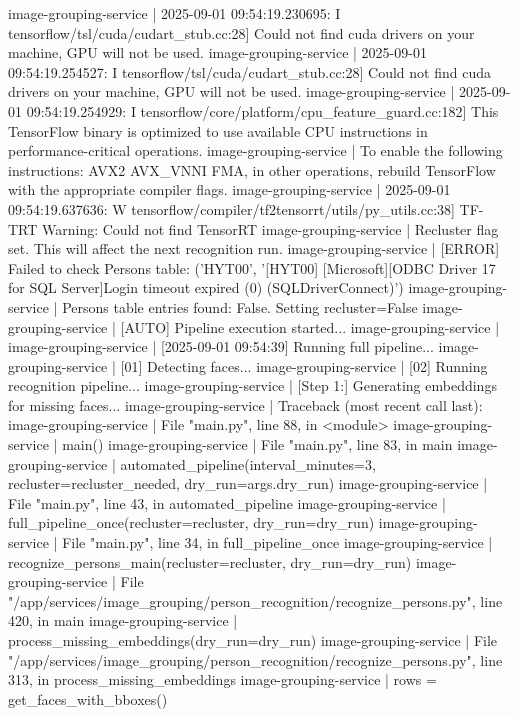 image-grouping-service  | 2025-09-01 09:54:19.230695: I tensorflow/tsl/cuda/cudart_stub.cc:28] Could not find cuda drivers on your machine, GPU will not be used.
image-grouping-service  | 2025-09-01 09:54:19.254527: I tensorflow/tsl/cuda/cudart_stub.cc:28] Could not find cuda drivers on your machine, GPU will not be used.
image-grouping-service  | 2025-09-01 09:54:19.254929: I tensorflow/core/platform/cpu_feature_guard.cc:182] This TensorFlow binary is optimized to use available CPU instructions in performance-critical operations.
image-grouping-service  | To enable the following instructions: AVX2 AVX_VNNI FMA, in other operations, rebuild TensorFlow with the appropriate compiler flags.
image-grouping-service  | 2025-09-01 09:54:19.637636: W tensorflow/compiler/tf2tensorrt/utils/py_utils.cc:38] TF-TRT Warning: Could not find TensorRT
image-grouping-service  | Recluster flag set. This will affect the next recognition run.
image-grouping-service  | [ERROR] Failed to check Persons table: ('HYT00', '[HYT00] [Microsoft][ODBC Driver 17 for SQL Server]Login timeout expired (0) (SQLDriverConnect)')
image-grouping-service  | Persons table entries found: False. Setting recluster=False
image-grouping-service  | [AUTO] Pipeline execution started...
image-grouping-service  |
image-grouping-service  | [2025-09-01 09:54:39] Running full pipeline...
image-grouping-service  | [01] Detecting faces...
image-grouping-service  | [02] Running recognition pipeline...
image-grouping-service  | [Step 1:] Generating embeddings for missing faces...
image-grouping-service  | Traceback (most recent call last):
image-grouping-service  |   File "main.py", line 88, in <module>
image-grouping-service  |     main()
image-grouping-service  |   File "main.py", line 83, in main
image-grouping-service  |     automated_pipeline(interval_minutes=3, recluster=recluster_needed, dry_run=args.dry_run)
image-grouping-service  |   File "main.py", line 43, in automated_pipeline
image-grouping-service  |     full_pipeline_once(recluster=recluster, dry_run=dry_run)
image-grouping-service  |   File "main.py", line 34, in full_pipeline_once
image-grouping-service  |     recognize_persons_main(recluster=recluster, dry_run=dry_run)
image-grouping-service  |   File "/app/services/image_grouping/person_recognition/recognize_persons.py", line 420, in main
image-grouping-service  |     process_missing_embeddings(dry_run=dry_run)
image-grouping-service  |   File "/app/services/image_grouping/person_recognition/recognize_persons.py", line 313, in process_missing_embeddings
image-grouping-service  |     rows = get_faces_with_bboxes()

